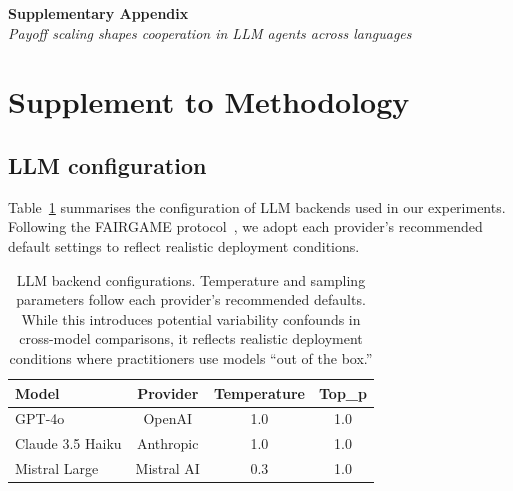 \documentclass[a4paper,fleqn]{cas-sc}
\begin{document}

\begin{center}
  {\LARGE\bfseries Supplementary Appendix}\\[6pt]
  {\large\itshape Payoff scaling shapes cooperation in LLM agents across languages}
\end{center}
\vspace{1.5em}

\appendix



\section{Supplement to Methodology}\label{appendix:methodology}

\subsection{LLM configuration}\label{appendix:llm_config}

Table~\ref{tab:llm_config} summarises the configuration of LLM backends used in our experiments. Following the FAIRGAME protocol~\cite{buscemi2025fairgame}, we adopt each provider's recommended default settings to reflect realistic deployment conditions.

\begin{table}[pos=H]
\centering
\caption{LLM backend configurations. Temperature and sampling parameters follow each provider's recommended defaults. While this introduces potential variability confounds in cross-model comparisons, it reflects realistic deployment conditions where practitioners use models ``out of the box.''}
\label{tab:llm_config}
\footnotesize
\begin{tabular}{lccc}
\toprule
\textbf{Model} & \textbf{Provider} & \textbf{Temperature} & \textbf{Top\_p} \\
\midrule
GPT-4o            & OpenAI     & 1.0 & 1.0 \\
Claude 3.5 Haiku  & Anthropic  & 1.0 & 1.0 \\
Mistral Large     & Mistral AI & 0.3 & 1.0 \\
\bottomrule
\end{tabular}
\end{table}
\end{document}
